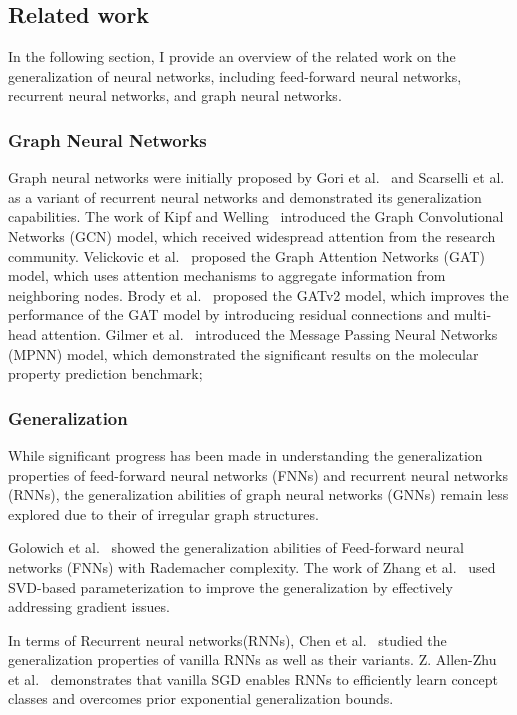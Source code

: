 \documentclass{article}
\begin{document}
\subsection{Related work}
In the following section, I provide an overview of the related work on the generalization of neural networks, including feed-forward neural networks, recurrent neural networks, and graph neural networks.

\subsubsection{Graph Neural Networks}
Graph neural networks were initially proposed by Gori et al.~\cite{gori2005new} and Scarselli et al.~\cite{scarselli2008graph} as a variant of recurrent neural networks and demonstrated its generalization capabilities. The work of Kipf and Welling~\cite{kipf2016semi} introduced the Graph Convolutional Networks (GCN) model, which received widespread attention from the research community. Velickovic et al.~\cite{velickovic2020pointer} proposed the Graph Attention Networks (GAT) model, which uses attention mechanisms to aggregate information from neighboring nodes. Brody et al.~\cite{brody2021attentive} proposed the GATv2 model, which improves the performance of the GAT model by introducing residual connections and multi-head attention. Gilmer et al.~\cite{gilmer2017neural} introduced the Message Passing Neural Networks (MPNN) model, which demonstrated the significant results on the molecular property prediction benchmark;

\subsubsection{Generalization}
While significant progress has been made in understanding the generalization properties of feed-forward neural networks (FNNs) and recurrent neural networks (RNNs), the generalization abilities of graph neural networks (GNNs) remain less explored due to their of irregular graph structures.

Golowich et al.~\cite{golowich2018size} showed the generalization abilities of Feed-forward neural networks (FNNs) with Rademacher complexity. The work of Zhang et al.~\cite{zhang2018stabilizing} used SVD-based parameterization to improve the generalization by effectively addressing gradient issues.

In terms of Recurrent neural networks(RNNs), Chen et al.~\cite{chen2019generalization} studied the generalization properties of vanilla RNNs as well as their variants. Z. Allen-Zhu et al.~\cite{allen2019can} demonstrates that vanilla SGD enables RNNs to efficiently learn concept classes and overcomes prior exponential generalization bounds. 
\end{document}
